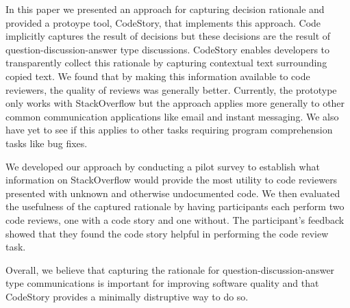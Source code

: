 \documentclass[../manifest.tex]{subfiles}
\begin{document}
In this paper we presented an approach for capturing decision rationale and provided a protoype tool, CodeStory, that implements this approach. Code implicitly captures the result of decisions but these decisions are the result of question-discussion-answer type discussions. CodeStory enables developers to transparently collect this rationale by capturing contextual text surrounding copied text. We found that by making this information available to code reviewers, the quality of reviews was generally better. Currently, the prototype only works with StackOverflow but the approach applies more generally to other common communication applications like email and instant messaging. We also have yet to see if this applies to other tasks requiring program comprehension tasks like bug fixes.

We developed our approach by conducting a pilot survey to establish what information on StackOverflow would provide the most utility to code reviewers presented with unknown and otherwise undocumented code. We then evaluated the usefulness of the captured rationale by having participants each perform two code reviews, one with a code story and one without. The participant's feedback showed that they found the code story helpful in performing the code review task.

Overall, we believe that capturing the rationale for question-discussion-answer type communications is important for improving software quality and that CodeStory provides a minimally distruptive way to do so.
\end{document}

